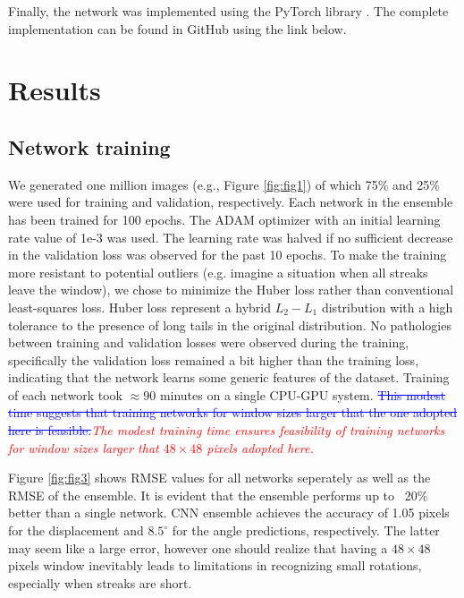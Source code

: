 \documentclass{svjour3}                     %
\newcommand{\new}[1]{\textit{\textcolor{red}{#1}}}
\newcommand{\old}[1]{\textcolor{blue}{\sout{#1}}}
\begin{document}
Finally, the network was implemented using the PyTorch library \cite{paszke2017automatic}. The complete implementation can be found in GitHub using the link below.

\section{Results}

\subsection{Network training}

We generated one million images (e.g., Figure \ref{fig:fig1}) of which 75\% and 25\% were used for training and validation, respectively. Each network in the ensemble has been trained for 100 epochs. The ADAM optimizer with an initial learning rate value of 1e-3 was used. The learning rate was halved if no sufficient decrease in the validation loss was observed for the past 10 epochs. To make the training more resistant to potential outliers (e.g. imagine a situation when all streaks leave the window), we chose to minimize the Huber loss \cite{huber1973robust} rather than conventional least-squares loss. Huber loss represent a hybrid $L_2-L_1$ distribution with a high tolerance to the presence of long tails in the original distribution. 
No pathologies between training and validation losses were observed during the training, specifically the validation loss remained a bit higher than the training loss, indicating that the network learns some generic features of the dataset. Training of each network took $\approx 90$ minutes on a single CPU-GPU system. \old{This modest time suggests that training networks for window sizes larger that the one adopted here is feasible.}\new{The modest training time ensures feasibility of training networks for window sizes larger that $48 \times 48$ pixels adopted here.}

Figure \ref{fig:fig3} shows RMSE values for all networks seperately as well as the RMSE of the ensemble. It is evident that the ensemble performs up to ~20\% better than a single network. CNN ensemble achieves the accuracy of 1.05 pixels for the displacement and $8.5^{\circ}$ for the angle predictions, respectively. The latter may seem like a large error, however one should realize that having a $48 \times 48$ pixels window inevitably leads to limitations in recognizing small rotations, especially when streaks are short. 
\end{document}
